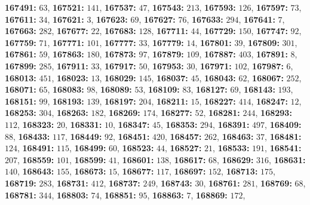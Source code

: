 \textsf{\bfseries 167491:} $63$, \textsf{\bfseries 167521:} $141$, \textsf{\bfseries 167537:} $47$, \textsf{\bfseries 167543:} $213$, \textsf{\bfseries 167593:} $126$, \textsf{\bfseries 167597:} $73$, \textsf{\bfseries 167611:} $34$, \textsf{\bfseries 167621:} $3$, \textsf{\bfseries 167623:} $69$, \textsf{\bfseries 167627:} $76$, \textsf{\bfseries 167633:} $294$, \textsf{\bfseries 167641:} $7$, \textsf{\bfseries 167663:} $282$, \textsf{\bfseries 167677:} $22$, \textsf{\bfseries 167683:} $128$, \textsf{\bfseries 167711:} $44$, \textsf{\bfseries 167729:} $150$, \textsf{\bfseries 167747:} $92$, \textsf{\bfseries 167759:} $71$, \textsf{\bfseries 167771:} $101$, \textsf{\bfseries 167777:} $33$, \textsf{\bfseries 167779:} $14$, \textsf{\bfseries 167801:} $39$, \textsf{\bfseries 167809:} $301$, \textsf{\bfseries 167861:} $59$, \textsf{\bfseries 167863:} $180$, \textsf{\bfseries 167873:} $97$, \textsf{\bfseries 167879:} $109$, \textsf{\bfseries 167887:} $403$, \textsf{\bfseries 167891:} $8$, \textsf{\bfseries 167899:} $285$, \textsf{\bfseries 167911:} $33$, \textsf{\bfseries 167917:} $50$, \textsf{\bfseries 167953:} $30$, \textsf{\bfseries 167971:} $102$, \textsf{\bfseries 167987:} $6$, \textsf{\bfseries 168013:} $451$, \textsf{\bfseries 168023:} $13$, \textsf{\bfseries 168029:} $145$, \textsf{\bfseries 168037:} $45$, \textsf{\bfseries 168043:} $62$, \textsf{\bfseries 168067:} $252$, \textsf{\bfseries 168071:} $65$, \textsf{\bfseries 168083:} $98$, \textsf{\bfseries 168089:} $53$, \textsf{\bfseries 168109:} $83$, \textsf{\bfseries 168127:} $69$, \textsf{\bfseries 168143:} $193$, \textsf{\bfseries 168151:} $99$, \textsf{\bfseries 168193:} $139$, \textsf{\bfseries 168197:} $204$, \textsf{\bfseries 168211:} $15$, \textsf{\bfseries 168227:} $414$, \textsf{\bfseries 168247:} $12$, \textsf{\bfseries 168253:} $304$, \textsf{\bfseries 168263:} $182$, \textsf{\bfseries 168269:} $174$, \textsf{\bfseries 168277:} $52$, \textsf{\bfseries 168281:} $244$, \textsf{\bfseries 168293:} $112$, \textsf{\bfseries 168323:} $20$, \textsf{\bfseries 168331:} $10$, \textsf{\bfseries 168347:} $45$, \textsf{\bfseries 168353:} $294$, \textsf{\bfseries 168391:} $497$, \textsf{\bfseries 168409:} $88$, \textsf{\bfseries 168433:} $117$, \textsf{\bfseries 168449:} $92$, \textsf{\bfseries 168451:} $420$, \textsf{\bfseries 168457:} $262$, \textsf{\bfseries 168463:} $37$, \textsf{\bfseries 168481:} $124$, \textsf{\bfseries 168491:} $115$, \textsf{\bfseries 168499:} $60$, \textsf{\bfseries 168523:} $44$, \textsf{\bfseries 168527:} $21$, \textsf{\bfseries 168533:} $191$, \textsf{\bfseries 168541:} $207$, \textsf{\bfseries 168559:} $101$, \textsf{\bfseries 168599:} $41$, \textsf{\bfseries 168601:} $138$, \textsf{\bfseries 168617:} $68$, \textsf{\bfseries 168629:} $316$, \textsf{\bfseries 168631:} $140$, \textsf{\bfseries 168643:} $155$, \textsf{\bfseries 168673:} $15$, \textsf{\bfseries 168677:} $117$, \textsf{\bfseries 168697:} $152$, \textsf{\bfseries 168713:} $175$, \textsf{\bfseries 168719:} $283$, \textsf{\bfseries 168731:} $412$, \textsf{\bfseries 168737:} $249$, \textsf{\bfseries 168743:} $30$, \textsf{\bfseries 168761:} $281$, \textsf{\bfseries 168769:} $68$, \textsf{\bfseries 168781:} $344$, \textsf{\bfseries 168803:} $74$, \textsf{\bfseries 168851:} $95$, \textsf{\bfseries 168863:} $7$, \textsf{\bfseries 168869:} $172$, 
